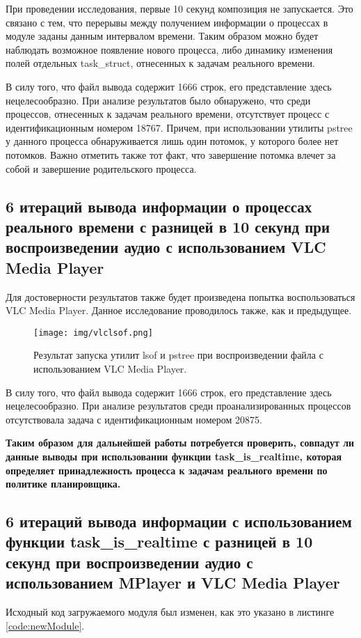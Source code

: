 При проведении исследования, первые 10 секунд композиция не запускается. Это связано с тем, что перерывы между получением информации о процессах в модуле заданы данным интервалом времени. Таким образом можно будет наблюдать возможное появление нового процесса, либо динамику изменения полей отдельных task\_struct, отнесенных к задачам реального времени.

В силу того, что файл вывода содержит 1666 строк, его представление здесь нецелесообразно. При анализе результатов было обнаружено, что среди процессов, отнесенных к задачам реального времени, отсутствует процесс с идентификационным номером 18767. Причем, при использовании утилиты pstree у данного процесса обнаруживается лишь один потомок, у которого более нет потомков. Важно отметить также тот факт, что завершение потомка влечет за собой и завершение родительского процесса.

\subsection{6 итераций вывода информации о процессах реального времени с разницей в 10 секунд при воспроизведении аудио с использованием VLC Media Player}
Для достоверности результатов также будет произведена попытка воспользоваться VLC Media Player. Данное исследование проводилось также, как и предыдущее.

\begin{figure}[H]
	\centering
	\texttt{[image: img/vlclsof.png]}
	\caption{Результат запуска утилит lsof и pstree при воспроизведении файла с использованием VLC Media Player.}
	\label{fig:vlclsof}
\end{figure}

В силу того, что файл вывода содержит 1666 строк, его представление здесь нецелесообразно. При анализе результатов среди проанализированных процессов отсутствовала задача с идентификационным номером 20875.

\textbf{Таким образом для дальнейшей работы потребуется проверить, совпадут ли данные выводы при использовании функции task\_is\_realtime, которая определяет принадлежность процесса к задачам реального времени по политике планировщика.}

\subsection{6 итераций вывода информации с использованием функции task\_is\_realtime с разницей в 10 секунд при воспроизведении аудио с использованием MPlayer и VLC Media Player}
Исходный код загружаемого модуля был изменен, как это указано в листинге \ref{code:newModule}.

